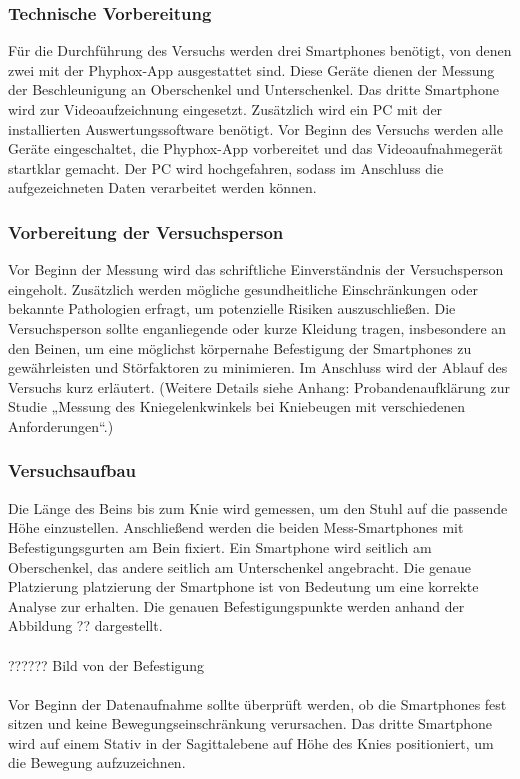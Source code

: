 
\subsubsection{Technische Vorbereitung}
Für die Durchführung des Versuchs werden drei Smartphones benötigt, von denen zwei mit der Phyphox-App ausgestattet sind. Diese Geräte dienen der Messung der Beschleunigung an Oberschenkel und Unterschenkel. Das dritte Smartphone wird zur Videoaufzeichnung eingesetzt. Zusätzlich wird ein PC mit der installierten Auswertungssoftware benötigt. Vor Beginn des Versuchs werden alle Geräte eingeschaltet, die Phyphox-App vorbereitet und das Videoaufnahmegerät startklar gemacht. Der PC wird hochgefahren, sodass im Anschluss die aufgezeichneten Daten verarbeitet werden können.

\subsubsection{Vorbereitung der Versuchsperson}
Vor Beginn der Messung wird das schriftliche Einverständnis der Versuchsperson eingeholt. Zusätzlich werden mögliche gesundheitliche Einschränkungen oder bekannte Pathologien erfragt, um potenzielle Risiken auszuschließen. Die Versuchsperson sollte enganliegende oder kurze Kleidung tragen, insbesondere an den Beinen, um eine möglichst körpernahe Befestigung der Smartphones zu gewährleisten und Störfaktoren zu minimieren. Im Anschluss wird der Ablauf des Versuchs kurz erläutert. (Weitere Details siehe Anhang: Probandenaufklärung zur Studie „Messung des Kniegelenkwinkels bei Kniebeugen mit verschiedenen Anforderungen“.)

\subsubsection{Versuchsaufbau}
Die Länge des Beins bis zum Knie wird gemessen, um den Stuhl auf die passende Höhe einzustellen. Anschließend werden die beiden Mess-Smartphones mit Befestigungsgurten am Bein fixiert. Ein Smartphone wird seitlich am Oberschenkel, das andere seitlich am Unterschenkel angebracht. Die genaue Platzierung platzierung der Smartphone ist von Bedeutung um eine korrekte Analyse zur erhalten. Die genauen Befestigungspunkte werden anhand der Abbildung ?? dargestellt. 
\\
\\
?????? Bild von der Befestigung
\\
\\
Vor Beginn der Datenaufnahme sollte überprüft werden, ob die Smartphones fest sitzen und keine Bewegungseinschränkung verursachen.
\noindent Das dritte Smartphone wird auf einem Stativ in der Sagittalebene auf Höhe des Knies positioniert, um die Bewegung aufzuzeichnen.

